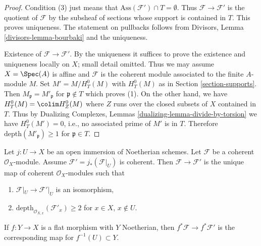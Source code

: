 \begin{proof}
Condition (3) just means that $\text{Ass}(\mathcal{F}') \cap T = \emptyset$.
Thus $\mathcal{F} \to \mathcal{F}'$ is the quotient of $\mathcal{F}$
by the subsheaf of sections whose support is contained in $T$.
This proves uniqueness. The statement on pullbacks follows from
Divisors, Lemma \ref{divisors-lemma-bourbaki}
and the uniqueness.

\medskip\noindent
Existence of $\mathcal{F} \to \mathcal{F}'$.
By the uniqueness it suffices to prove the
existence and uniqueness locally on $X$; small detail omitted.
Thus we may assume $X = \Spec(A)$ is affine and $\mathcal{F}$
is the coherent module associated to the finite $A$-module $M$.
Set $M' = M / H^0_T(M)$ with $H^0_T(M)$ as in Section \ref{section-supports}.
Then $M_\mathfrak p = M'_\mathfrak p$ for $\mathfrak p \not \in T$
which proves (1). On the other hand, we have
$H^0_T(M) = \colim H^0_Z(M)$ where $Z$ runs over the closed
subsets of $X$ contained in $T$. Thus by
Dualizing Complexes, Lemmas \ref{dualizing-lemma-divide-by-torsion}
we have $H^0_T(M') = 0$, i.e., no associated prime
of $M'$ is in $T$. Therefore $\text{depth}(M'_\mathfrak p) \geq 1$
for $\mathfrak p \in T$.
\end{proof}

\begin{lemma}
\label{lemma-get-depth-2-along-Z}
Let $j : U \to X$ be an open immersion of Noetherian schemes.
Let $\mathcal{F}$ be a coherent $\mathcal{O}_X$-module.
Assume $\mathcal{F}' = j_*(\mathcal{F}|_U)$ is coherent.
Then $\mathcal{F} \to \mathcal{F}'$ is the unique map
of coherent $\mathcal{O}_X$-modules such that
\begin{enumerate}
\item $\mathcal{F}|_U \to \mathcal{F}'|_U$
is an isomorphism,
\item $\text{depth}_{\mathcal{O}_{X, x}}(\mathcal{F}'_x) \geq 2$
for $x \in X$, $x \not \in U$.
\end{enumerate}
If $f : Y \to X$ is a flat morphism with $Y$ Noetherian, then
$f^*\mathcal{F} \to f^*\mathcal{F}'$ is the corresponding
map for $f^{-1}(U) \subset Y$.
\end{lemma}

